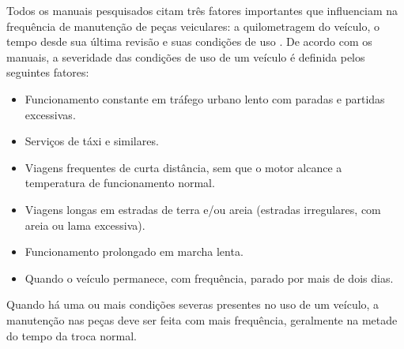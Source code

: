 \documentclass[12pt]{article}
\begin{document}
Todos os manuais pesquisados citam três fatores importantes que influenciam na
frequência de manutenção de peças veiculares: a quilometragem do veículo, o
tempo desde sua última revisão e suas condições de uso \cite{manualhyundai,
manualonix, manualka}. De acordo com os manuais, a severidade das condições de
uso de um veículo é definida pelos seguintes fatores:

\begin{itemize}
  \item Funcionamento constante em tráfego urbano lento com paradas e partidas
  excessivas.
  \item Serviços de táxi e similares.
  \item Viagens frequentes de curta distância, sem que o motor alcance a
  temperatura de funcionamento normal.
  \item Viagens longas em estradas de terra e/ou areia (estradas irregulares,
  com areia ou lama excessiva).
  \item Funcionamento prolongado em marcha lenta.
  \item Quando o veículo permanece, com frequência, parado por mais de dois
  dias.
\end{itemize}

Quando há uma ou mais condições severas presentes no uso de um veículo, a
manutenção nas peças deve ser feita com mais frequência, geralmente na metade do
tempo da troca normal.
\end{document}
